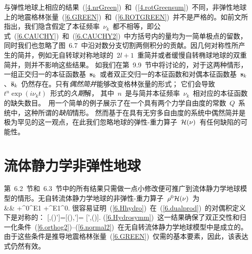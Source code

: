 与弹性地球上相应的结果~(\ref{4.nrGreen})~和~(\ref{4.rotGreensum})~不同，非弹性地球上的地震格林张量~(\ref{6.GREEN})~和~(\ref{6.ROTGREEN})~并不是严格的。如前文所指出，我们隐含假定了本征频率~$\nu_k$~都不相等，即公式~(\ref{6.CAUCHY})~和~(\ref{6.CAUCHY2})~中方括号内的量均为一简单极点的留数，同时我们也忽略了图~6.7~中沿对数分支切割两侧积分的贡献。因几何对称性所产生的简并，例如无自转球对称地球的~$2l+1$~重简并或者缓慢自转椭球地球的双重简并，则并不影响这些结果。
%
如我们在第~9.9~节中将讨论的，对于这两种情形，一组正交归一的本征函数基~$\mbox{${\bf s}$}_k$~或者双正交归一的本征函数和对偶本征函数基~$\mbox{${\bf s}$}_k$、$\overline{\mbox{${\bf s}$}}_k$~仍然存在。只有{\em 偶然简并\/}能够改变格林张量的形式；
%
%
它们会导致~$t^n\exp(i\nu_kt)$~形式的{\em 久期\/}解，
%
其中~$n$~是与简并本征频率~$\nu_k$~相对应的本征函数的缺失数目。\textcite{tromp&dahlen90b}~用一个简单的例子展示了在一个具有两个力学自由度的常数~$Q$~系统中，这种所谓的{\em 缺陷\/}情形。
%
然而基于在具有无穷多自由度的系统中偶然简并是极为罕见的这一观点，在此我们忽略地球的弹性-重力算子~$\mbox{$\cal H$}(\nu)$~有任何缺陷的可能性。
%
%
%

\section{流体静力学非弹性地球}
%
%

第~6.2~节和~6.3~节中的所有结果只需做一点小修改便可推广到流体静力学地球模型的情形。无自转流体静力学地球的非弹性-重力算子~$\rho^0\mbox{$\cal H$}(\nu)$~为
\eqa
\label{6.Hhydro}
 \nonumber \\
&&\mbox{}\qquad\qquad\qquad
+\rho^0\bdel\phi^{\rm E1}
+\rho^{\rm E1}\bdel\phi^0.
\ena
很容易证明~(\ref{6.Hhydro})~在~(\ref{6.dualprod})~的对偶积定义下是对称的：
\eq
\label{6.Hydrosymm}
[\bs,\sH(\nu)\bs']=[\sH(\nu)\bs,\bs']=
[\bs',\sH(\nu)\bs].
\en
(\ref{6.Hydrosymm})~这一结果确保了双正交性和归一化条件~(\ref{6.orthog2})--(\ref{6.normal2})~在无自转流体静力学地球模型中是成立的。
%
%
由于这些条件是推导地震格林张量~(\ref{6.GREEN})~仅需的基本要素，因此，该表达式仍然有效。

